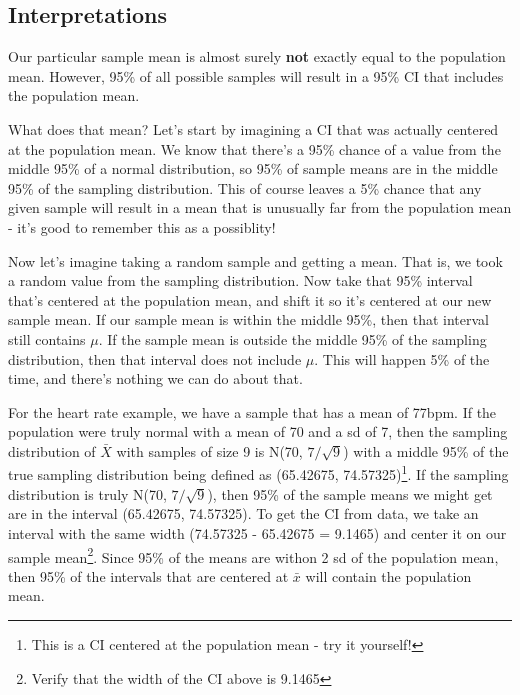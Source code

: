 \documentclass[
  letterpaper,
  DIV=11,
  numbers=noendperiod,
  oneside]{scrreprt}
\begin{document}
\hypertarget{interpretations}{%
\subsection{Interpretations}\label{interpretations}}

\begin{tcolorbox}[enhanced jigsaw, toprule=.15mm, colbacktitle=quarto-callout-note-color!10!white, title=\textcolor{quarto-callout-note-color}{\faInfo}\hspace{0.5em}{Interpretation of the CI}, arc=.35mm, colframe=quarto-callout-note-color-frame, colback=white, titlerule=0mm, left=2mm, bottomtitle=1mm, bottomrule=.15mm, breakable, opacitybacktitle=0.6, leftrule=.75mm, toptitle=1mm, coltitle=black, rightrule=.15mm, opacityback=0]

Our particular sample mean is almost surely \textbf{not} exactly equal
to the population mean. However, 95\% of all possible samples will
result in a 95\% CI that includes the population mean.

\end{tcolorbox}

What does that mean? Let's start by imagining a CI that was actually
centered at the population mean. We know that there's a 95\% chance of a
value from the middle 95\% of a normal distribution, so 95\% of sample
means are in the middle 95\% of the sampling distribution. This of
course leaves a 5\% chance that any given sample will result in a mean
that is unusually far from the population mean - it's good to remember
this as a possiblity!

Now let's imagine taking a random sample and getting a mean. That is, we
took a random value from the sampling distribution. Now take that 95\%
interval that's centered at the population mean, and shift it so it's
centered at our new sample mean. If our sample mean is within the middle
95\%, then that interval still contains \(\mu\). If the sample mean is
outside the middle 95\% of the sampling distribution, then that interval
does not include \(\mu\). This will happen 5\% of the time, and there's
nothing we can do about that.

For the heart rate example, we have a sample that has a mean of 77bpm.
If the population were truly normal with a mean of 70 and a sd of 7,
then the sampling distribution of \(\bar X\) with samples of size 9 is
N(70, \(7/\sqrt{9}\)) with a middle 95\% of the true sampling
distribution being defined as (65.42675, 74.57325)\footnote{This is a CI
  centered at the population mean - try it yourself!}. If the sampling
distribution is truly N(70, \(7/\sqrt{9}\)), then 95\% of the sample
means we might get are in the interval (65.42675, 74.57325). To get the
CI from data, we take an interval with the same width (74.57325 -
65.42675 = 9.1465) and center it on our sample mean\footnote{Verify that
  the width of the CI above is 9.1465}. Since 95\% of the means are
withon 2 sd of the population mean, then 95\% of the intervals that are
centered at \(\bar x\) will contain the population mean.
\end{document}
